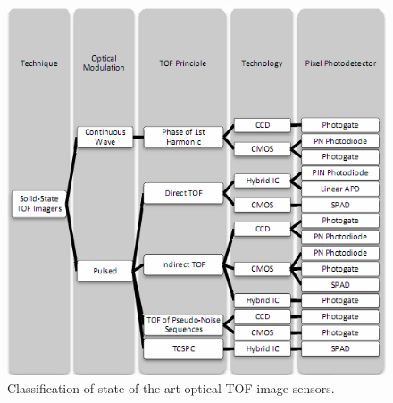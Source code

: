 \begin{figure}
\centering
\includegraphics[scale = 1]{chapters/img/intro_receiver1.png}
\caption{Classification of state-of-the-art optical TOF image sensors.}
\label{fig:intro_receiver1}
\end{figure}

